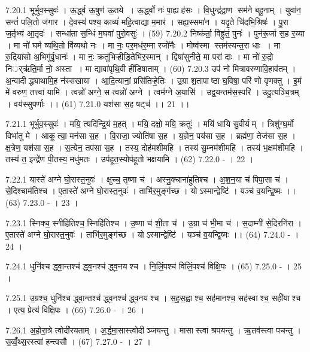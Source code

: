 7.20.1
भूर्भुव॒स्सुवः॑ । ऊ॒र्द्ध्व ऊ॒षुण॑ ऊ॒तये । ऊ॒र्द्ध्वो नः॑ पा॒ह्यह॑सः । वि॒धुन्द्र॑द्रा॒ण सम॑ने बहू॒नाम् । युवा॑न॒ सन्तं॑ पलि॒तो ज॑गार । दे॒वस्य॑ पश्य॒ काव्यं॑ महि॒त्वाद्या म॒मार॑ । सह्य॒स्समा॑न । यदृ॒ते चि॑दभि॒श्रिषः॑ । पु॒रा ज॒र्तृभ्य॑ आ॒तृदः॑ । सन्धा॑ता स॒न्धिं म॒घवा॑ पुरो॒वसुः॑ । (59)
7.20.2
निष्क॑र्ता॒ विह्रु॑तं॒ पुनः॑ । पुन॑रू॒र्जा स॒ह र॒य्या । मा नो॑ घर्म व्यथि॒तो वि॑व्यथो नः । मा नः॒ पर॒मध॑र॒म्मा रजो॑नैः । मोष्व॑स्मा स्तम॑स्यन्त॒रा धाः । मा रु॒द्रिया॑सो अ॒भिगु॑र्वृ॒धानः॑ । मा नः॒ क्रतु॑भिऱ्हीडि॒तेभि॑र॒स्मान् । द्विषा॑सुनीते॒ मा परा॑ दाः । मा नो॑ रु॒द्रो निर््ऋ॑ति॒र्मा नो॒ अस्ता । मा द्यावा॑पृथि॒वी ही॑डिषाताम् । (60)
7.20.3
उप॑ नो मित्रावरुणावि॒हाव॑तम् । अ॒न्वादीद्ध्याथामि॒ह न॑स्सखाया । आ॒दि॒त्यानां॒ प्रसि॑तिऱ्हे॒तिः । उ॒ग्रा श॒तापाष्ठा घ॒विषा॒ परि॑ णो वृणक्तु । इ॒मं मे॑ वरुण॒ तत्त्वा॑ यामि । त्वन्नो॑ अग्ने॒ स त्वन्नो॑ अग्ने । त्वम॑ग्ने अ॒यासि॑ । उद्व॒यन्तम॑स॒स्परि॑ । उदु॒त्यञ्चि॒त्रम् । वय॑स्सुपर्णाः ।। (61)
7.21.0
यश॑सा स॒ह षट्च॑ ।। 21 ।।
\anuvakamend

7.21.1
भूर्भुव॒स्सुवः॑ । मयि॒ त्यदि॑न्द्रि॒यं म॒हत् । मयि॒ दक्षो॒ मयि॒ क्रतुः॑ । मयि॑ धायि सु॒वीर्यम् । त्रिशु॑ग्घ॒र्मो विभा॑तु मे । आकूत्या॒ मन॑सा स॒ह । वि॒राजा॒ ज्योति॑षा स॒ह । य॒ज्ञेन॒ पय॑सा स॒ह । ब्रह्म॑णा॒ तेज॑सा स॒ह । क्ष॒त्रेण॒ यश॑सा स॒ह । स॒त्येन॒ तप॑सा स॒ह । तस्य॒ दोह॑मशीमहि । तस्य॑ सु॒म्नम॑शीमहि । तस्य॑ भ॒क्षम॑शीमहि । तस्य॑ त॒ इन्द्रे॑ण पी॒तस्य॒ मधु॑मतः । उप॑हूत॒स्योप॑हूतो भक्षयामि । (62)
7.22.0
- । 22 ।
\anuvakamend


7.22.1
यास्ते॑ अग्ने घो॒रास्त॒नुवः॑ । क्षुच्च॒ तृष्णा च॑ । अस्नु॒क्चाना॑हुतिश्च । अ॒श॒न॒या च॑ पिपा॒सा च॑ । से॒दिश्चाम॑तिश्च । ए॒तास्ते॑ अग्ने घो॒रास्त॒नुवः॑ । ताभि॑र॒मुङ्ग॑च्छ । योऽस्मान्द्वेष्टि॑ । यञ्च॑ व॒यन्द्वि॒ष्मः ।। (63)
7.23.0
- । 23 ।
\anuvakamend

7.23.1
स्निक्च॒ स्नीहि॑तिश्च॒ स्निहि॑तिश्च । उ॒ष्णा च॑ शी॒ता च॑ । उ॒ग्रा च॑ भी॒मा च॑ । स॒दाम्नी॑ से॒दिरनि॑रा । ए॒तास्ते॑ अग्ने घो॒रास्त॒नुवः॑ । ताभि॑र॒मुङ्ग॑च्छ । योऽस्मान्द्वेष्टि॑ । यञ्च॑ व॒यन्द्वि॒ष्मः ।। (64)
7.24.0
- । 24 ।
\anuvakamend

7.24.1
धुनि॑श्च द्ध्वा॒न्तश्च॑ द्ध्व॒नश्च॑ द्ध्व॒नय॑श्च । नि॒लिं॒पश्च॑ विलिं॒पश्च॑ विक्षि॒पः । (65)
7.25.0
- । 25 ।
\anuvakamend

7.25.1
उ॒ग्रश्च॒ धुनि॑श्च द्ध्वा॒न्तश्च॑ द्ध्व॒नश्च॑ द्ध्व॒नय॑श्च । स॒ह॒स॒ह्वाश्च॒ सह॑मानश्च॒ सह॑स्वाश्च॒ सही॑याश्च । एत्य॒ प्रेत्य॑ विक्षि॒पः । (66)
7.26.0
- । 26 ।
\anuvakamend

7.26.1
अ॒हो॒रा॒त्रे त्वोदी॑रयताम् । अ॒र्द्ध॒मा॒सास्त्वोदीञ्जयन्तु । मासास्त्वा श्रपयन्तु । ऋ॒तव॑स्त्वा पचन्तु । स॒व्वँ॒थ्स॒रस्त्वा॑ हन्त्वसौ । (67)
7.27.0
- । 27 ।
\anuvakamend

